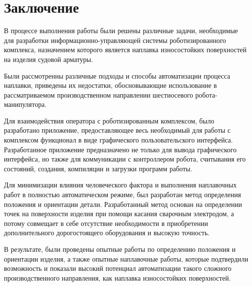 \chapter{Заключение}
В процессе выполнения работы были решены различные задачи, необходимые для разработки информационно-управляющей системы роботизированного комплекса, назначением которого является наплавка износостойких поверхностей на изделия судовой арматуры.

Были рассмотренны различные подходы и способы автоматизации процесса наплавки, приведены их недостатки, обосновывающие использование в рассматриваемом производственном направлении шестиосевого робота-манипулятора.

Для взаимодействия оператора с роботизированным комплексом, было разработано приложение, предоставляющее весь необходимый для работы с комплексом функционал в виде графического пользовательского интерфейса.
Разработанное приложение предназначено не только для вывода графического интерфейса, но также для коммуникации с контроллером робота, считывания его состояний, создания, компиляции и загрузки программ работы.

Для минимизации влияния человеческого фактора и выполнения наплавочных работ в полностью автоматическом режиме, был разработан метод определения положения и ориентации детали.
Разработанный метод основан на определении точек на поверхности изделия при помощи касания сварочным электродом, а потому совмещает в себе отсутствие необходимости в приобретении дополнительного дорогостоящего оборудования и высокую точность.

В результате, были проведены опытные работы по определению положения и ориентации изделия, а также опытные наплавочные работы, которые подтвердили возможность и показали высокий потенциал автоматизации такого сложного производственного направления, как наплавка износостойких поверхностей.
